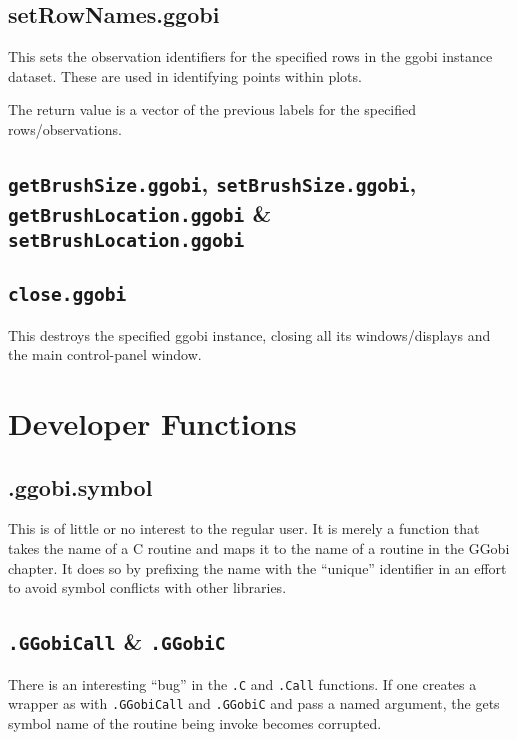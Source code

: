 \documentclass{article}
\def\SFunction#1{{\texttt{\red #1}}}
\begin{document}
\subsection{setRowNames.ggobi}
This sets the observation identifiers for the 
specified rows in the ggobi instance dataset.
These are used in identifying points within 
plots.

The return value is a vector of the previous labels for the
specified rows/observations.



\subsection{\SFunction{getBrushSize.ggobi},
\SFunction{setBrushSize.ggobi},
\SFunction{getBrushLocation.ggobi} \&
\SFunction{setBrushLocation.ggobi}}


\subsection{\SFunction{close.ggobi}}
This destroys the specified ggobi instance, closing all its
windows/displays and the main control-panel window.


\section{Developer Functions}

\subsection{.ggobi.symbol}
This is of little or no interest to the regular user.  It is merely a
function that takes the name of a C routine and maps it to the name of
a routine in the GGobi chapter.  It does so by prefixing the name with
the ``unique'' identifier  in an effort to avoid
symbol conflicts with other libraries.

\subsection{\SFunction{.GGobiCall} \& \SFunction{.GGobiC}}

There is an interesting ``bug'' in the \SFunction{.C} and
\SFunction{.Call} functions. If one creates a wrapper as with
\SFunction{.GGobiCall} and \SFunction{.GGobiC} and pass a named
argument, the gets symbol name of the routine being invoke becomes
corrupted.
\end{document}
